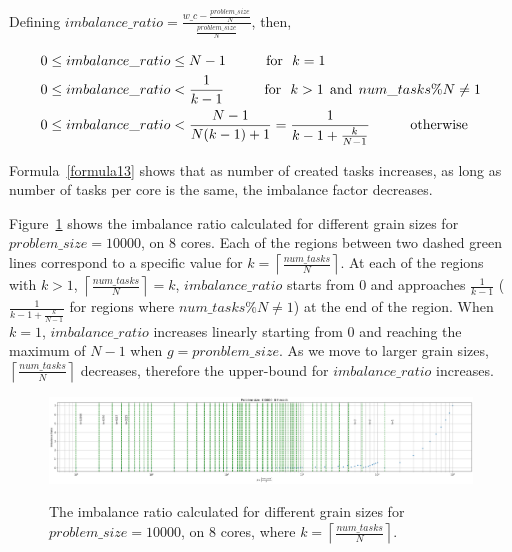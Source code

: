 Defining $imbalance\_{ratio}=\frac{w\_c-\frac{problem\_{size}}{N}}{\frac{problem\_{size}}{N}}$, then,

\begin{equation}\label{formula13}
\begin{aligned}
0&\leq{imbalance\_{ratio}}\leq{N-1}  \text{\:\:\:\:\:\:\:\:\:\:\:\:\:for\:\:\:}k={1}\\
0&\leq{imbalance\_{ratio}}<\frac{1}{k-1}  \text{\:\:\:\:\:\:\:\:\:\:\:\:\:for\:\:\:}k>{1} \text{\:\:and\:\:}num\_{tasks}\%{N}\neq{1}\\
0&\leq{imbalance\_{ratio}}<\frac{N-1}{N(k-1)+1}=\frac{1}{k-1+\frac{k}{N-1}}\text{\:\:\:\:\:\:\:\:\:\:\:\:\:otherwise}
\end{aligned}
\end{equation}

Formula~\ref{formula13} shows that as number of created tasks increases, as long as number of tasks per core is the same, the imbalance factor decreases. 

\vspace{\baselineskip}

Figure~\ref{fig38} shows the imbalance ratio calculated for different grain sizes for $problem\_size=10000$, on 8 cores. Each of the regions between two dashed green lines correspond to a specific value for $k=\left\lceil{\frac{num\_{tasks}}{N}}\right \rceil$. 
At each of the regions with $k>1$, $\left\lceil{\frac{num\_{tasks}}{N}}\right \rceil=k$,  $imbalance\_{ratio}$ starts from $0$ and approaches $\frac{1}{k-1}$ ($\frac{1}{k-1+\frac{k}{N-1}}$ for regions where $num\_{tasks}\%{N}\neq{1}$) at the end of the region. When $k=1$, $imbalance\_{ratio}$ increases linearly starting from 0 and reaching the maximum of $N-1$ when $g=pronblem\_{size}$. As we move to larger grain sizes, $\left\lceil{\frac{num\_{tasks}}{N}}\right \rceil$ decreases, therefore the upper-bound for $imbalance\_{ratio}$ increases.   


\vspace{\baselineskip}	
\begin{figure}[H]
	\centering
	{\includegraphics[scale=.25]{images/hpx_for_loop/w_c_all.png}}
	\caption{The imbalance ratio calculated for different grain sizes for $problem\_size=10000$, on 8 cores, where $k=\left\lceil{\frac{num\_{tasks}}{N}}\right \rceil$.}\label{fig38}		
\end{figure}


